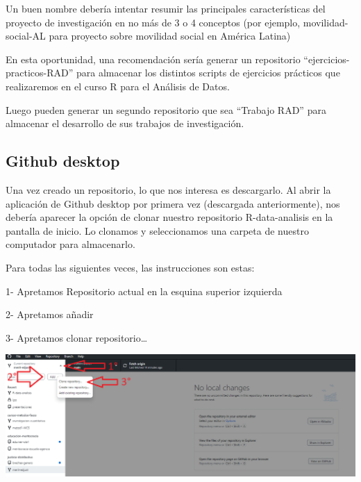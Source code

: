 \documentclass[
  letterpaper,
  DIV=11,
  numbers=noendperiod]{scrartcl}
\begin{document}
\begin{tcolorbox}[enhanced jigsaw, opacitybacktitle=0.6, colframe=quarto-callout-note-color-frame, breakable, toprule=.15mm, bottomrule=.15mm, toptitle=1mm, colback=white, bottomtitle=1mm, rightrule=.15mm, title=\textcolor{quarto-callout-note-color}{\faInfo}\hspace{0.5em}{Note}, leftrule=.75mm, coltitle=black, opacityback=0, titlerule=0mm, arc=.35mm, left=2mm, colbacktitle=quarto-callout-note-color!10!white]

Un buen nombre debería intentar resumir las principales características
del proyecto de investigación en no más de 3 o 4 conceptos (por ejemplo,
movilidad-social-AL para proyecto sobre movilidad social en América
Latina)

En esta oportunidad, una recomendación sería generar un repositorio
``ejercicios-practicos-RAD'' para almacenar los distintos scripts de
ejercicios prácticos que realizaremos en el curso R para el Análisis de
Datos.

Luego pueden generar un segundo repositorio que sea ``Trabajo RAD'' para
almacenar el desarrollo de sus trabajos de investigación.

\end{tcolorbox}

\subsection{Github desktop}\label{github-desktop}

Una vez creado un repositorio, lo que nos interesa es descargarlo. Al
abrir la aplicación de Github desktop por primera vez (descargada
anteriormente), nos debería aparecer la opción de clonar nuestro
repositorio R-data-analisis en la pantalla de inicio. Lo clonamos y
seleccionamos una carpeta de nuestro computador para almacenarlo.

Para todas las siguientes veces, las instrucciones son estas:

1- Apretamos Repositorio actual en la esquina superior izquierda

2- Apretamos añadir

3- Apretamos clonar repositorio\ldots{}

\includegraphics{images/clonar.png}
\end{document}
